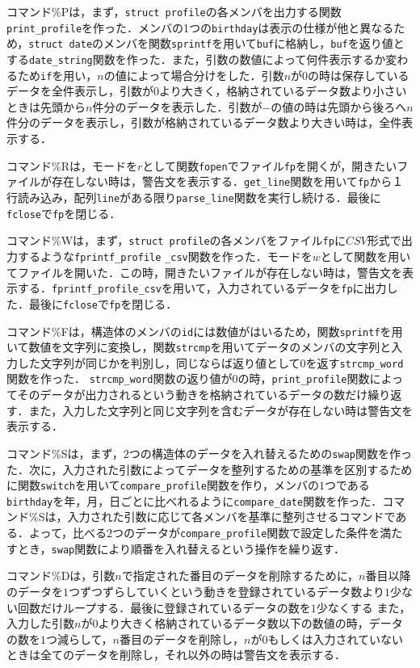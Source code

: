 \documentclass[a4j,11pt]{jarticle}
\begin{document}
コマンド\%Pは，まず，\verb|struct profile|の各メンバを出力する関数\verb|print_profile|を作った．メンバの1つの\verb|birthday|は表示の仕様が他と異なるため，\verb|struct date|のメンバを関数\verb|sprintf|を用いて\verb|buf|に格納し，\verb|buf|を返り値とする\verb|date_string|関数を作った．また，引数の数値によって何件表示するか変わるため\verb|if|を用い，$n$の値によって場合分けをした．引数$n$が$0$の時は保存しているデータを全件表示し，引数が$0$より大きく，格納されているデータ数より小さいときは先頭から$n$件分のデータを表示した．引数が$-$の値の時は先頭から後ろへ$n$件分のデータを表示し，引数が格納されているデータ数より大きい時は，全件表示する．

コマンド\%Rは，モードを$r$として関数\verb|fopen|でファイル\verb|fp|を開くが，開きたいファイルが存在しない時は，警告文を表示する．\verb|get_line|関数を用いて\verb|fp|から$１$行読み込み，配列\verb|line|がある限り\verb|parse_line|関数を実行し続ける．最後に\verb|fclose|で\verb|fp|を閉じる．

コマンド\%Wは，まず，\verb|struct profile|の各メンバをファイル\verb|fp|に$CSV$形式で出力するような\verb|fprintf_profile|
\verb|_csv|関数を作った．モードを$w$として関数を用いてファイルを開いた．この時，開きたいファイルが存在しない時は，警告文を表示する．\verb|fprintf_profile_csv|を用いて，入力されているデータを\verb|fp|に出力した．最後に\verb|fclose|で\verb|fp|を閉じる．　　　

コマンド\%Fは，構造体のメンバの\verb|id|には数値がはいるため，関数\verb|sprintf|を用いて数値を文字列に変換し，関数\verb|strcmp|を用いてデータのメンバの文字列と入力した文字列が同じかを判別し，同じならば返り値として$0$を返す\verb|strcmp_word|関数を作った．
\verb|strcmp_word|関数の返り値が$0$の時，\verb|print_profile|関数によってそのデータが出力されるという動きを格納されているデータの数だけ繰り返す．また，入力した文字列と同じ文字列を含むデータが存在しない時は警告文を表示する．

コマンド\%Sは，まず，$2$つの構造体のデータを入れ替えるための\verb|swap|関数を作った．次に，入力された引数によってデータを整列するための基準を区別するために関数\verb|switch|を用いて\verb|compare_profile|関数を作り，メンバの$1$つである\verb|birthday|を年，月，日ごとに比べれるように\verb|compare_date|関数を作った．コマンド\%Sは，入力された引数に応じて各メンバを基準に整列させるコマンドである．よって，比べる$2$つのデータが\verb|compare_profile|関数で設定した条件を満たすとき，\verb|swap|関数により順番を入れ替えるという操作を繰り返す．

コマンド\%Dは，引数$n$で指定された番目のデータを削除するために，$n$番目以降のデータを$1$つずつずらしていくという動きを登録されているデータ数より$1$少ない回数だけループする．最後に登録されているデータの数を$1$少なくする
また，入力した引数$n$が$0$より大きく格納されているデータ数以下の数値の時，データの数を$1$つ減らして，$n$番目のデータを削除し，$n$が$0$もしくは入力されていないときは全てのデータを削除し，それ以外の時は警告文を表示する．
\end{document}
